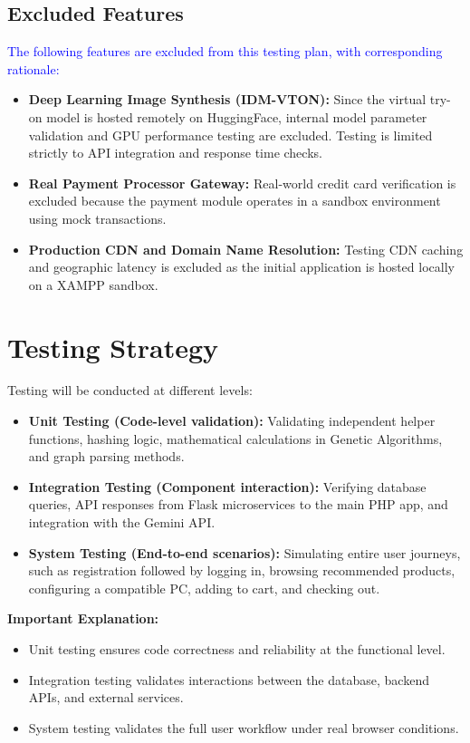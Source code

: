 \documentclass[12pt,a4paper]{article}
\newcommand{\student}[1]{\textcolor{blue}{#1}} %
\begin{document}
\subsection{Excluded Features}
\student{The following features are excluded from this testing plan, with corresponding rationale:}
\begin{itemize}
\item \textbf{Deep Learning Image Synthesis (IDM-VTON):} Since the virtual try-on model is hosted remotely on HuggingFace, internal model parameter validation and GPU performance testing are excluded. Testing is limited strictly to API integration and response time checks.
\item \textbf{Real Payment Processor Gateway:} Real-world credit card verification is excluded because the payment module operates in a sandbox environment using mock transactions.
\item \textbf{Production CDN and Domain Name Resolution:} Testing CDN caching and geographic latency is excluded as the initial application is hosted locally on a XAMPP sandbox.
\end{itemize}

\section{Testing Strategy}

Testing will be conducted at different levels:

\begin{itemize}
\item \textbf{Unit Testing (Code-level validation):} Validating independent helper functions, hashing logic, mathematical calculations in Genetic Algorithms, and graph parsing methods.
\item \textbf{Integration Testing (Component interaction):} Verifying database queries, API responses from Flask microservices to the main PHP app, and integration with the Gemini API.
\item \textbf{System Testing (End-to-end scenarios):} Simulating entire user journeys, such as registration followed by logging in, browsing recommended products, configuring a compatible PC, adding to cart, and checking out.
\end{itemize}

\textbf{Important Explanation:}

\begin{itemize}
\item Unit testing ensures code correctness and reliability at the functional level.
\item Integration testing validates interactions between the database, backend APIs, and external services.
\item System testing validates the full user workflow under real browser conditions.
\end{itemize}
\end{document}
